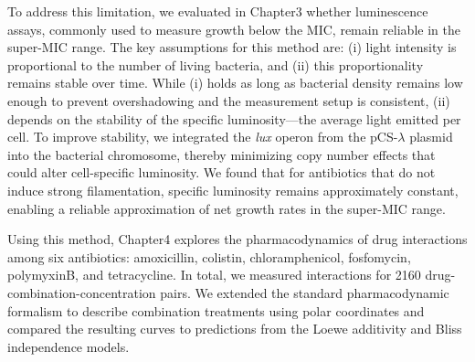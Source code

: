 \documentclass[../main.tex]{subfiles}
\begin{document}
To address this limitation, we evaluated in Chapter3 whether luminescence assays\cite{Kishony2003}, commonly used to measure growth below the MIC, remain reliable in the super-MIC range.
The key assumptions for this method are: (i) light intensity is proportional to the number of living bacteria, and (ii) this proportionality remains stable over time.
While (i) holds as long as bacterial density remains low enough to prevent overshadowing and the measurement setup is consistent, (ii) depends on the stability of the specific luminosity---the average light emitted per cell.
To improve stability, we integrated the \textit{lux} operon from the pCS-$\lambda$ plasmid into the bacterial chromosome, thereby minimizing copy number effects that could alter cell-specific luminosity.
We found that for antibiotics that do not induce strong filamentation, specific luminosity remains approximately constant, enabling a reliable approximation of net growth rates in the super-MIC range.

Using this method, Chapter4 explores the pharmacodynamics of drug interactions among six antibiotics: amoxicillin, colistin, chloramphenicol, fosfomycin, polymyxinB, and tetracycline.
In total, we measured interactions for 2160 drug-combination-concentration pairs.
We extended the standard pharmacodynamic formalism to describe combination treatments using polar coordinates and compared the resulting curves to predictions from the Loewe additivity and Bliss independence models.
\end{document}
